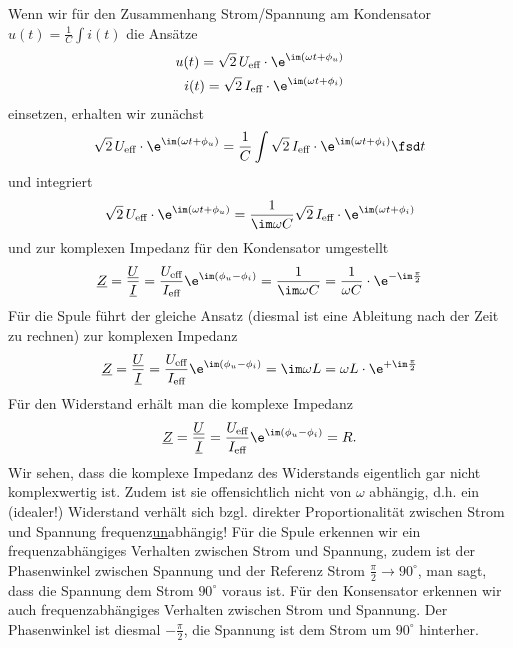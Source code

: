 Wenn wir für den Zusammenhang Strom/Spannung am Kondensator
$u(t) = \frac{1}{C} \int i(t)$
die Ansätze
\begin{align}
u(t) = \sqrt{2} \, U_\text{eff} \cdot \e^{\im(\omega t + \phi_u)}\\
i(t) = \sqrt{2} \, I_\text{eff} \cdot \e^{\im(\omega t + \phi_i)}
\end{align}
einsetzen, erhalten wir zunächst
\begin{align}
\sqrt{2} \, U_\text{eff} \cdot \e^{\im(\omega t + \phi_u)} = \frac{1}{C} \int \sqrt{2} \, I_\text{eff} \cdot \e^{\im(\omega t + \phi_i)} \fsd t
\end{align}
und integriert
\begin{align}
\sqrt{2} \, U_\text{eff} \cdot \e^{\im(\omega t + \phi_u)} = \frac{1}{\im \omega C} \sqrt{2} \, I_\text{eff} \cdot \e^{\im(\omega t + \phi_i)}
\end{align}
und zur komplexen Impedanz für den Kondensator umgestellt
\begin{align}
\label{eq:appb_ZC}
\underline{Z} = \frac{\underline{U}}{\underline{I}} = \frac{U_\text{eff}}{I_\text{eff}} \e^{\im (\phi_u-\phi_i)} = \frac{1}{\im \omega C} = \frac{1}{\omega C} \cdot \e^{-\im \frac{\pi}{2}}
\end{align}
%
Für die Spule führt der gleiche Ansatz (diesmal ist eine Ableitung nach der Zeit zu rechnen)
zur komplexen Impedanz
\begin{align}
\underline{Z} = \frac{\underline{U}}{\underline{I}} = \frac{U_\text{eff}}{I_\text{eff}} \e^{\im (\phi_u-\phi_i)} = \im \omega L = \omega L \cdot \e^{+\im \frac{\pi}{2}}
\end{align}
%
Für den Widerstand erhält man die komplexe Impedanz
\begin{align}
\underline{Z} = \frac{\underline{U}}{\underline{I}} = \frac{U_\text{eff}}{I_\text{eff}} \e^{\im (\phi_u-\phi_i)} = R.
\end{align}
%
Wir sehen, dass die komplexe Impedanz des Widerstands eigentlich gar nicht komplexwertig ist.
Zudem ist sie offensichtlich nicht von $\omega$ abhängig, d.h. ein (idealer!) Widerstand
verhält sich bzgl. direkter Proportionalität zwischen Strom und Spannung frequenz\underline{un}abhängig!
%
Für die Spule erkennen wir ein frequenzabhängiges Verhalten zwischen Strom und Spannung, zudem
ist der Phasenwinkel zwischen Spannung und der Referenz Strom $\frac{\pi}{2} \rightarrow 90^\circ$, man sagt,
dass die Spannung dem Strom $90^\circ$ voraus ist.
%
Für den Konsensator erkennen wir auch frequenzabhängiges Verhalten zwischen Strom und Spannung.
Der Phasenwinkel ist diesmal $-\frac{\pi}{2}$, die Spannung ist dem Strom um $90^\circ$ hinterher.



